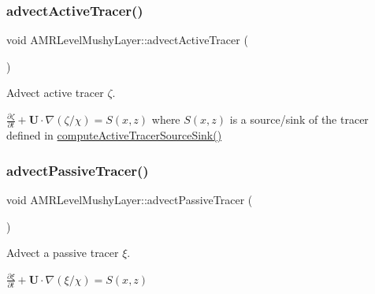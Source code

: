 \subsubsection{\texorpdfstring{advect\+Active\+Tracer()}{advectActiveTracer()}}
{\footnotesize\ttfamily void A\+M\+R\+Level\+Mushy\+Layer\+::advect\+Active\+Tracer (\begin{DoxyParamCaption}{ }\end{DoxyParamCaption})\hspace{0.3cm}{\ttfamily [protected]}}



Advect active tracer $ \zeta $. 

$ \frac{\partial \zeta}{\partial t} + \mathbf{U} \cdot \nabla (\zeta/\chi) = S(x,z)$ where $ S(x,z) $ is a source/sink of the tracer defined in \hyperlink{class_a_m_r_level_mushy_layer_a1175d9df4f5acbc4de503d9cb253947e}{compute\+Active\+Tracer\+Source\+Sink()} \mbox{\label{class_a_m_r_level_mushy_layer_aff2c6df2ba8316ced0ae3aa476c676f4}} 
\subsubsection{\texorpdfstring{advect\+Passive\+Tracer()}{advectPassiveTracer()}}
{\footnotesize\ttfamily void A\+M\+R\+Level\+Mushy\+Layer\+::advect\+Passive\+Tracer (\begin{DoxyParamCaption}{ }\end{DoxyParamCaption})\hspace{0.3cm}{\ttfamily [protected]}}



Advect a passive tracer $ \xi $. 

$ \frac{\partial \xi}{\partial t} + \mathbf{U} \cdot \nabla (\xi/\chi) = S(x,z)$ \mbox{\label{class_a_m_r_level_mushy_layer_a367dd316723860bb7bd1c8b97895a3f4}} 
